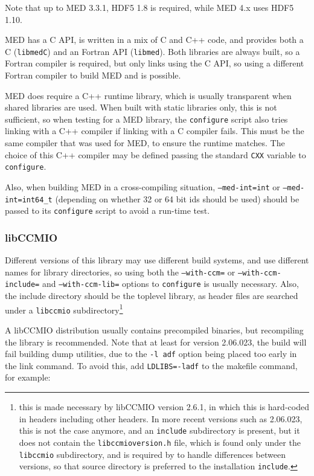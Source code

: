 \documentclass[a4paper,10pt,twoside]{csshortdoc}
\begin{document}
Note that up to MED 3.3.1, HDF5 1.8 is required, while MED 4.x
uses  HDF5 1.10.

MED has a C API, is written in a mix of C and C++ code,
and provides both a C (\texttt{libmedC}) and an Fortran API
(\texttt{libmed}). Both libraries are always built, so a Fortran
compiler is required, but \CS only links using the C API, so using
a different Fortran compiler to build MED and \CS is possible.

MED does require a C++ runtime library, which is usually transparent
when shared libraries are used. When built with static libraries
only, this is not sufficient, so when testing for a MED library,
the \CS \texttt{configure} script also tries linking with a C++
compiler if linking with a C compiler fails. This must be the
same compiler that was used for MED, to ensure the runtime matches.
The choice of this C++ compiler may be defined passing the
standard \texttt{CXX} variable to \texttt{configure}.

Also, when building MED in a cross-compiling situation,
\texttt{--med-int=int} or \texttt{--med-int=int64\_t} (depending
on whether 32 or 64 bit ids should be used) should be
passed to its \texttt{configure} script to avoid a run-time
test.

\subsubsection{libCCMIO\label{sec:ext:libccmio}}

Different versions of this library may use different build
systems, and use different names for library directories,
so using both the \texttt{--with-ccm=} or \texttt{--with-ccm-include=}
and \texttt{--with-ccm-lib=} options to \texttt{configure} is
usually necessary.
Also, the include directory should be the toplevel library,
as header files are searched under a \texttt{libccmio}
subdirectory\footnote{this is made necessary by libCCMIO version
2.6.1, in which this is hard-coded in headers including other
headers. In more recent versions such as 2.06.023, this is not the
case anymore, and an \texttt{include} subdirectory is present, but
it does not contain the \texttt{libccmioversion.h} file, which is
found only under the \texttt{libccmio} subdirectory, and is required
by \CS to handle differences between versions, so that source
directory is preferred to the installation \texttt{include}.}

A libCCMIO distribution usually contains precompiled
binaries, but recompiling the library is recommended.
Note that at least for version 2.06.023, the build will fail
building dump utilities, due to the \texttt{-l adf} option
being placed too early in the link command. To avoid this,
add \texttt{LDLIBS=-ladf} to the makefile command, for example:
\end{document}
